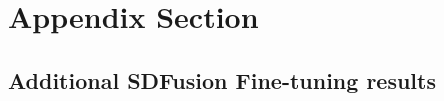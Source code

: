 \section{Appendix Section}
\label{sec:appendix_section}

\subsection{Additional SDFusion Fine-tuning results}

